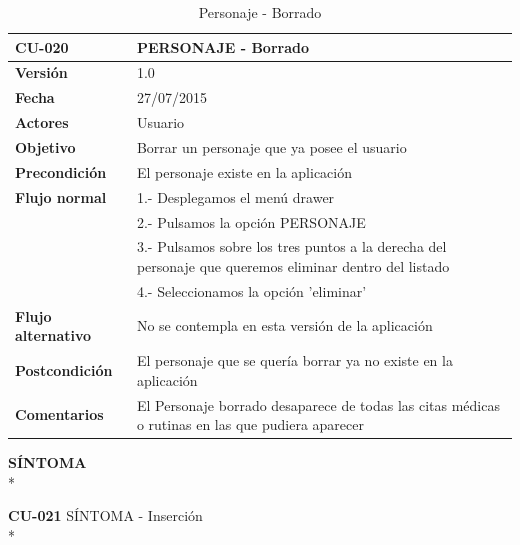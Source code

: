 \documentclass[../pfc.tex]{subfiles}
\begin{document}
		\begin{table}[H]
			\centering
			\begin{tabular}[t]{|p{3cm}|p{9.5cm}|}
				\hline \textbf{CU-020} & \textbf{PERSONAJE - Borrado} \\*
				\hline\hline \textbf{Versión} & 1.0 \\*
				\hline\hline \textbf{Fecha} & 27/07/2015 \\*
				\hline\textbf{Actores} 	& Usuario\\*
				\hline \textbf{Objetivo} & Borrar un personaje que ya posee el usuario\\* 			
				\hline \textbf{Precondición} & El personaje existe en la aplicación\\* 
				\hline \textbf{Flujo normal} & 1.- Desplegamos el menú drawer \\* 
				& 2.- Pulsamos la opción PERSONAJE\\*	
				& 3.- Pulsamos sobre los tres puntos a la derecha del personaje que queremos eliminar dentro del listado\\*	
				& 4.- Seleccionamos la opción 'eliminar'\\*	
				\hline \textbf{Flujo alternativo} & No se contempla en esta versión de la aplicación \\* 
				\hline \textbf{Postcondición} & El personaje que se quería borrar ya no existe en la aplicación \\* 
				\hline \textbf{Comentarios}   & El Personaje borrado desaparece de todas las citas médicas o rutinas en las que pudiera aparecer\\*
				\hline
			\end{tabular}
			\caption{Personaje - Borrado}
			\label{tabla:caso020}
		\end{table}
		
	\clearpage
		
	\textbf{SÍNTOMA}\\*
	
	\textbf{CU-021}	SÍNTOMA - Inserción\\*
	
\end{document}
